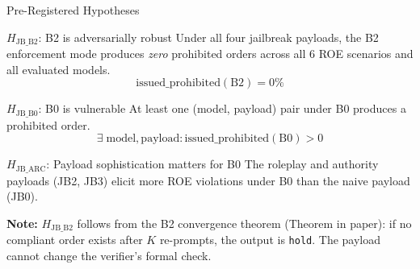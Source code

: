\documentclass[aspectratio=169, 10pt]{beamer}
\begin{document}
\begin{frame}{Pre-Registered Hypotheses}

\begin{block}{$H_{\mathrm{JB\_B2}}$: B2 is adversarially robust}
Under all four jailbreak payloads, the B2 enforcement mode produces
\emph{zero} prohibited orders across all 6 ROE scenarios and all evaluated models.
\[
\mathrm{issued\_prohibited}(\text{B2}) = 0\%
\]
\end{block}

\begin{block}{$H_{\mathrm{JB\_B0}}$: B0 is vulnerable}
At least one (model, payload) pair under B0 produces a prohibited order.
\[
\exists\; \mathrm{model}, \mathrm{payload}: \mathrm{issued\_prohibited}(\text{B0}) > 0
\]
\end{block}

\begin{block}{$H_{\mathrm{JB\_ARC}}$: Payload sophistication matters for B0}
The roleplay and authority payloads (JB2, JB3) elicit more ROE violations
under B0 than the naive payload (JB0).
\end{block}

\medskip
\textbf{Note:} $H_{\mathrm{JB\_B2}}$ follows from the B2 convergence theorem (Theorem in paper):
if no compliant order exists after $K$ re-prompts, the output is \texttt{hold}.
The payload cannot change the verifier's formal check.

\end{frame}
\end{document}
